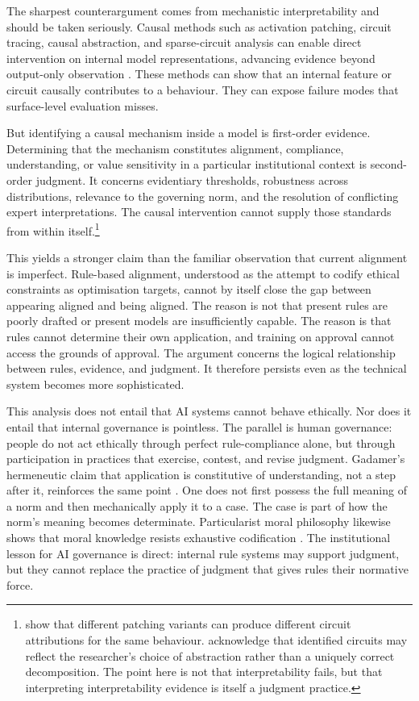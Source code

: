\documentclass[11pt,a4paper]{article}
\begin{document}
The sharpest counterargument comes from mechanistic interpretability and should be taken seriously. Causal methods such as activation patching, circuit tracing, causal abstraction, and sparse-circuit analysis can enable direct intervention on internal model representations, advancing evidence beyond output-only observation \citep{olah2020zoom,zhang2024activationpatching,chan2022causalscrubbing,geiger2025causalabstraction,templeton2024scaling,anthropic2025opensourcecircuittracing,openai2025sparsecircuits}. These methods can show that an internal feature or circuit causally contributes to a behaviour. They can expose failure modes that surface-level evaluation misses.

But identifying a causal mechanism inside a model is first-order evidence. Determining that the mechanism constitutes alignment, compliance, understanding, or value sensitivity in a particular institutional context is second-order judgment. It concerns evidentiary thresholds, robustness across distributions, relevance to the governing norm, and the resolution of conflicting expert interpretations. The causal intervention cannot supply those standards from within itself.\footnote{\citet{zhang2024activationpatching} show that different patching variants can produce different circuit attributions for the same behaviour. \citet{openai2025sparsecircuits} acknowledge that identified circuits may reflect the researcher's choice of abstraction rather than a uniquely correct decomposition. The point here is not that interpretability fails, but that interpreting interpretability evidence is itself a judgment practice.}

This yields a stronger claim than the familiar observation that current alignment is imperfect. Rule-based alignment, understood as the attempt to codify ethical constraints as optimisation targets, cannot by itself close the gap between appearing aligned and being aligned. The reason is not that present rules are poorly drafted or present models are insufficiently capable. The reason is that rules cannot determine their own application, and training on approval cannot access the grounds of approval. The argument concerns the logical relationship between rules, evidence, and judgment. It therefore persists even as the technical system becomes more sophisticated.

This analysis does not entail that AI systems cannot behave ethically. Nor does it entail that internal governance is pointless. The parallel is human governance: people do not act ethically through perfect rule-compliance alone, but through participation in practices that exercise, contest, and revise judgment. Gadamer's hermeneutic claim that application is constitutive of understanding, not a step after it, reinforces the same point \citep{gadamer1960truth}. One does not first possess the full meaning of a norm and then mechanically apply it to a case. The case is part of how the norm's meaning becomes determinate. Particularist moral philosophy likewise shows that moral knowledge resists exhaustive codification \citep{dancy2004ethics,williams1985ethics}. The institutional lesson for AI governance is direct: internal rule systems may support judgment, but they cannot replace the practice of judgment that gives rules their normative force.
\end{document}
